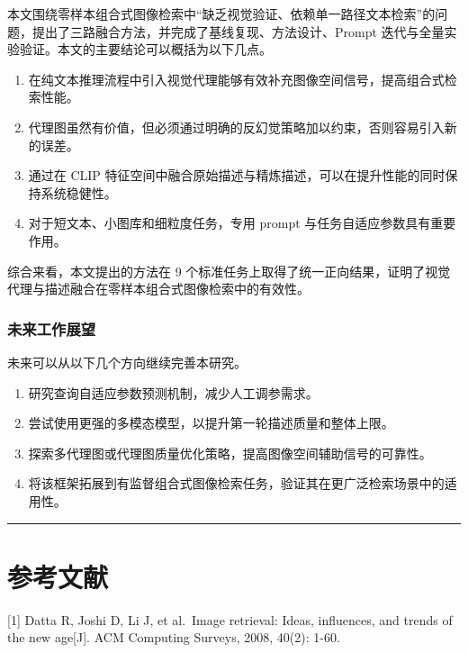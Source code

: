 \documentclass[12pt,a4paper,UTF8,oneside,openany]{ctexrep}
\providecommand{\tightlist}{%
  \setlength{\itemsep}{0pt}\setlength{\parskip}{0pt}}
\begin{document}
本文围绕零样本组合式图像检索中``缺乏视觉验证、依赖单一路径文本检索''的问题，提出了三路融合方法，并完成了基线复现、方法设计、Prompt
迭代与全量实验验证。本文的主要结论可以概括为以下几点。

\begin{enumerate}
\def\labelenumi{\arabic{enumi}.}
\tightlist
\item
  在纯文本推理流程中引入视觉代理能够有效补充图像空间信号，提高组合式检索性能。
\item
  代理图虽然有价值，但必须通过明确的反幻觉策略加以约束，否则容易引入新的误差。
\item
  通过在 CLIP
  特征空间中融合原始描述与精炼描述，可以在提升性能的同时保持系统稳健性。
\item
  对于短文本、小图库和细粒度任务，专用 prompt
  与任务自适应参数具有重要作用。
\end{enumerate}

综合来看，本文提出的方法在 9
个标准任务上取得了统一正向结果，证明了视觉代理与描述融合在零样本组合式图像检索中的有效性。

\hypertarget{ux672aux6765ux5de5ux4f5cux5c55ux671b}{%
\subsection{未来工作展望}\label{ux672aux6765ux5de5ux4f5cux5c55ux671b}}

未来可以从以下几个方向继续完善本研究。

\begin{enumerate}
\def\labelenumi{\arabic{enumi}.}
\tightlist
\item
  研究查询自适应参数预测机制，减少人工调参需求。
\item
  尝试使用更强的多模态模型，以提升第一轮描述质量和整体上限。
\item
  探索多代理图或代理图质量优化策略，提高图像空间辅助信号的可靠性。
\item
  将该框架拓展到有监督组合式图像检索任务，验证其在更广泛检索场景中的适用性。
\end{enumerate}

\begin{center}\rule{0.5\linewidth}{0.5pt}\end{center}

\chapter*{参考文献}

{[}1{]} Datta R, Joshi D, Li J, et al.~Image retrieval: Ideas,
influences, and trends of the new age{[}J{]}. ACM Computing Surveys,
2008, 40(2): 1-60.
\end{document}
